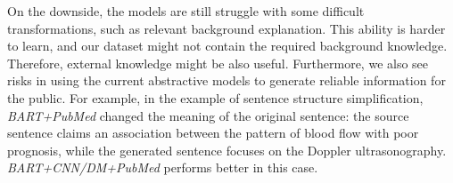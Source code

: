 \documentclass[letterpaper, table]{article} %
\begin{document}


On the downside, the  models are still struggle with some difficult transformations, such as relevant background explanation. This ability is harder to learn, and our dataset might not contain the required background knowledge.
Therefore, external knowledge might be also useful.
Furthermore, we also see risks in using the current abstractive models to generate reliable information for the public. For example, in the example of sentence structure simplification, \textit{BART+PubMed} changed the meaning of the original sentence: the source sentence claims an association between the pattern of blood flow with poor prognosis, while the generated sentence focuses on the Doppler ultrasonography. \textit{BART+CNN/DM+PubMed}
performs better in this case.
\end{document}

